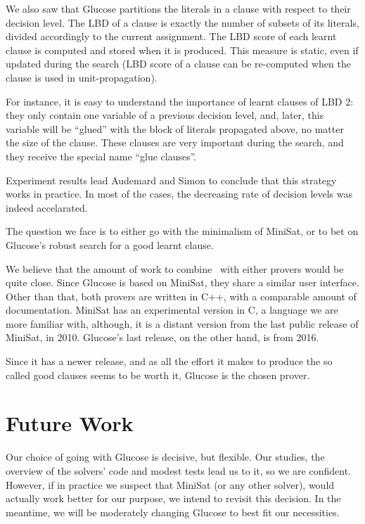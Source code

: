 We also saw that Glucose partitions the literals in a clause with respect to
their decision level. The LBD of a clause is exactly the number of subsets of
its literals, divided accordingly to the current assignment. The LBD score of
each learnt clause is computed and stored when it is produced. This measure is
static, even if updated during the search (LBD score of a clause can be
re-computed when the clause is used in unit-propagation). 

For instance, it is easy to understand the importance of learnt clauses of LBD
2: they only contain one variable of a previous decision level, and, later, this
variable will be ``glued'' with the block of literals propagated above, no
matter the size of the clause. These clauses are very important during the
search, and they receive the special name ``glue clauses''.

Experiment results lead Audemard and Simon to conclude that this strategy
works in practice. In most of the cases, the decreasing rate of decision
levels was indeed accelarated.

The question we face is to either go with the minimalism of MiniSat, or to
bet on Glucose's robust search for a good learnt clause.

We believe that the amount of work to combine \ksp~with either provers would be
quite close. Since Glucose is based on MiniSat, they share a similar user
interface. Other than that, both provers are written in C++, with a comparable
amount of documentation. MiniSat has an experimental version in C, a language we
are more familiar with, although, it is a distant version from the last public
release of MiniSat, in 2010. Glucose's last release, on the other hand, is from
2016. 

Since it has a newer release, and as all the effort it makes to produce the
so called good clauses seems to be worth it, Glucose is the chosen prover.

\section{Future Work}%
\label{sec:future}

Our choice of going with Glucose is decisive, but flexible. Our studies, the
overview of the solvers' code and modest tests lead us to it, so we are
confident. However, if in practice we suspect that MiniSat (or any other
solver), would actually work better for our purpose, we intend to revisit this
decision. In the meantime, we will be moderately changing Glucose to best fit
our necessities.


